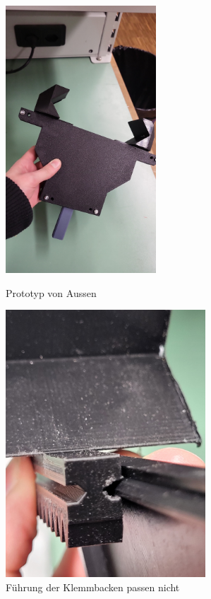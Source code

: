 \documentclass[../main.tex]{subfiles}
\begin{document}
\begin{figure}[h!]
    \centering
    \begin{minipage}[t]{0.45\textwidth}
        \centering
        \includegraphics[height=10cm]{img/greifarmtest/prototyp_test_fertig.jpeg}
        \caption{Prototyp von Aussen}
        \label{fig:hardware_test_fertig}
    \end{minipage}%
    \hfill
    \begin{minipage}[t]{0.45\textwidth}
        \centering
        \includegraphics[height=10cm]{img/greifarmtest/prototyp_test_klemmen_gleiten.jpeg}
        \caption{Führung der Klemmbacken passen nicht}
        \label{fig:hardware_test_klemmen_gleiten}
    \end{minipage}
\end{figure}
\end{document}
